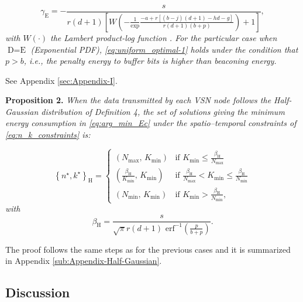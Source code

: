 \documentclass[twocolumn,english]{IEEEtran}
\theoremstyle{plain}
\theoremstyle{definition}
\begin{document}
\begin{equation}
\gamma_{\textrm{E}}=-\frac{s}{r(d+1)\left[W\left(-\frac{1}{\exp}\frac{-a+r\left[\left(b-j\right)\left(d+1\right)-hd-g\right]}{r(d+1)(b+p)}\right)+1\right]},\label{eq:gamma_E}
\end{equation}
\emph{with $W(\cdot)$ the Lambert product-log function \cite{corless1996lambertw}.
For the particular case when }$\text{D}=\text{E}$ \emph{(Exponential
PDF), \eqref{eq:uniform_optimal-1} holds under the condition that
$p>b$, i.e., the penalty energy to buffer bits is higher than beaconing
energy.} 
\begin{IEEEproof}
See Appendix \ref{sec:Appendix-I}. 
\end{IEEEproof}
\textbf{Proposition 2.}\emph{ When the data transmitted by each VSN
node follows the Half-Gaussian distribution of Definition 4, the set
of solutions giving the minimum energy consumption in \eqref{eq:arg_min_Ec}
under the spatio--temporal constraints of \eqref{eq:n_k_constraints}
is:}

\begin{equation}
\left\{ n^{\star},k^{\star}\right\} _{\text{H}}=\begin{cases}
\left(N_{\text{max}},\, K_{\text{min}}\right) & \text{if}\,\, K_{\text{min}}\le\frac{\beta_{\text{H}}}{N_{\max}}\\
\left(\frac{\beta_{\text{H}}}{K_{\text{min}}},\, K_{\text{min}}\right) & \text{if}\,\,\frac{\beta_{\text{H}}}{N_{\max}}<K_{\text{min}}\leq\frac{\beta_{\text{H}}}{N_{\text{min}}}\\
\left(N_{\textrm{min}},\, K_{\text{min}}\right) & \text{if}\,\, K_{\text{min}}>\frac{\beta_{\text{H}}}{N_{\text{min}}},
\end{cases}\label{eq:halfgaussian_optimal}
\end{equation}
\emph{with} 
\begin{equation}
\beta_{\text{H}}=\frac{s}{\sqrt{\pi}r\left(d+1\right)\text{ erf}^{-1}\left(\frac{p}{b+p}\right)}.\label{eq:beta_H}
\end{equation}

\begin{IEEEproof}
The proof follows the same steps as for the previous cases and it
is summarized in Appendix \ref{sub:Appendix-Half-Gaussian}. 
\end{IEEEproof}

\subsection{Discussion}
\end{document}
